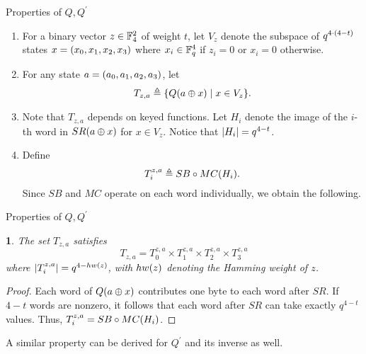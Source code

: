 \documentclass[notheorems]{beamer}
\newtheorem{lemma}{\translate{Lemma}}
\theoremstyle{definition}
\theoremstyle{example}
\begin{document}
    \begin{frame}{Properties of \(Q, Q^\prime\)}
        \begin{enumerate}
            \item<1-> For a binary vector \(z \in \mathbb F_4^2\) of weight \(t\), let
            \(V_z\) denote the subspace of \(q^{4\cdot(4 - t)}\) states \(x
            = (x_0, x_1, x_2, x_3)\) where \(x_i \in \mathbb F_q^4\) if \(z_i =
            0\) or \(x_i = 0\) otherwise. 
            \item<2-> For any state \(a = (a_0, a_1, a_2, a_3)\), let
            \begin{equation}
                T_{z, a} \triangleq \{Q(a \oplus x) \mid x \in V_z\}.
                \label{eq:tza-def}
            \end{equation}
            \item<3-> Note that \(T_{z, a}\) depends on keyed functions. Let
            \(H_i\) denote the image of the \(i\)-th word in \(SR(a \oplus
            x)\) for \(x \in V_z\). Notice that \(\left\vert H_i\right\vert = q^{4 - t}\). 
            \item<4-> Define
            \begin{equation}
                T_i^{z, a} \triangleq SB \circ MC(H_i).
                \label{eq:tiza-def}
            \end{equation}
            Since \(SB\) and \(MC\) operate on each word individually, we obtain
            the following.
        \end{enumerate}
    \end{frame}

    \begin{frame}{Properties of \(Q, Q^\prime\)}
        \begin{lemma}
            \label{lem:tz-rel}
            The set \(T_{z, a}\) satisfies
            \begin{equation}
                T_{z, a} = T_0^{z, a} \times T_1^{z, a} \times T_2^{z, a} \times T_3^{z, a}
                \label{eq:tz-rel}
            \end{equation}
            where \(\left\vert T_i^{z, a}\right\vert = q^{4 - hw(z)}\), with \(hw(z)\)
            denoting the Hamming weight of \(z\).
        \end{lemma}
        \pause
        \begin{proof}
            Each word of \(Q(a \oplus x)\) contributes one byte to each
            word after \(SR\). If \(4 - t\) words are nonzero, it follows that
            each word after \(SR\) can take exactly \(q^{4 - t}\) values. Thus,
            \(T_i^{z, a} = SB \circ MC(H_i)\).
        \end{proof}
        \pause
        A similar property can be derived for \(Q^\prime\) and its inverse as
        well.
    \end{frame}
\end{document}

